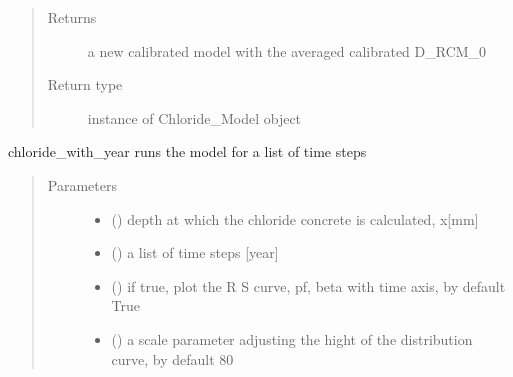 \documentclass[letterpaper,10pt,english]{sphinxmanual}
\begin{document}
\begin{fulllineitems}
\begin{fulllineitems}
\begin{quote}
\begin{description}
\begin{itemize}
\end{itemize}

\item[{Returns}] \leavevmode
\sphinxAtStartPar
a new calibrated model with the averaged calibrated D\_RCM\_0

\item[{Return type}] \leavevmode
\sphinxAtStartPar
instance of Chloride\_Model object

\end{description}\end{quote}

\end{fulllineitems}


\begin{fulllineitems}
\label{\detokenize{chloride:chloride.Chloride_Model.chloride_with_year}}
\sphinxAtStartPar
chloride\_with\_year runs the model for a list of time steps
\begin{quote}\begin{description}
\item[{Parameters}] \leavevmode\begin{itemize}
\item {} 
\sphinxAtStartPar
{} () \textendash{} depth at which the chloride concrete is calculated, x{[}mm{]}

\item {} 
\sphinxAtStartPar
{} () \textendash{} a list of time steps {[}year{]}

\item {} 
\sphinxAtStartPar
{} (\sphinxstyleliteralemphasis{\sphinxupquote{, }}) \textendash{} if true, plot the R S curve, pf, beta with time axis, by default True

\item {} 
\sphinxAtStartPar
{} (\sphinxstyleliteralemphasis{\sphinxupquote{, }}) \textendash{} a scale parameter adjusting the hight of the distribution curve, by default 80


\end{itemize}
\end{description}
\end{quote}
\end{fulllineitems}
\end{fulllineitems}
\end{document}
